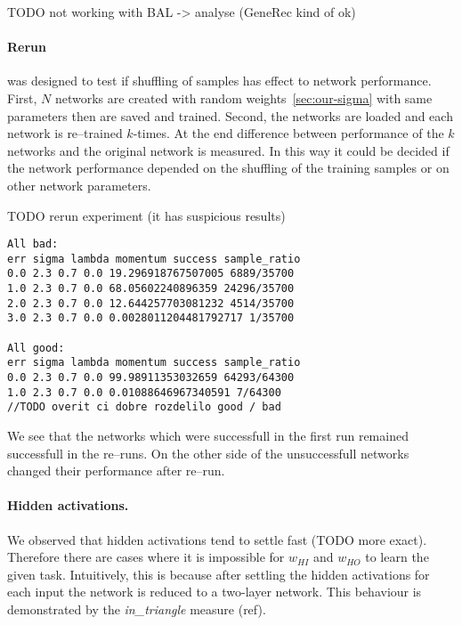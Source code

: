 TODO not working with BAL -> analyse (GeneRec kind of ok) 

\paragraph{Rerun} was designed to test if shuffling of samples has effect to network performance. First, $N$ networks are created with random weights~\ref{sec:our-sigma} with same parameters then are saved and trained. Second, the networks are loaded and each network is re--trained $k$-times. At the end difference between performance of the $k$ networks and the original network is measured. In this way it could be decided if the network performance depended on the shuffling of the training samples or on other network parameters. 

TODO rerun experiment (it has suspicious results) 

\begin{lstlisting}
All bad: 
err sigma lambda momentum success sample_ratio
0.0 2.3 0.7 0.0 19.296918767507005 6889/35700
1.0 2.3 0.7 0.0 68.05602240896359 24296/35700
2.0 2.3 0.7 0.0 12.644257703081232 4514/35700
3.0 2.3 0.7 0.0 0.0028011204481792717 1/35700

All good: 
err sigma lambda momentum success sample_ratio
0.0 2.3 0.7 0.0 99.98911353032659 64293/64300
1.0 2.3 0.7 0.0 0.01088646967340591 7/64300
//TODO overit ci dobre rozdelilo good / bad
\end{lstlisting}

We see that the networks which were successfull in the first run remained successfull in the re--runs. On the other side of the unsuccessfull networks changed their performance after re--run. 

\paragraph{Hidden activations.}
\label{sec:our-hidden-activation} 

We observed that hidden activations tend to settle fast (TODO more exact). Therefore there are cases where it is impossible for $w_{HI}$ and $w_{HO}$ to learn the given task. Intuitively, this is because after settling the hidden activations for each input the network is reduced to a two-layer network. This behaviour is demonstrated by the \emph{in\_triangle} measure (ref). 

